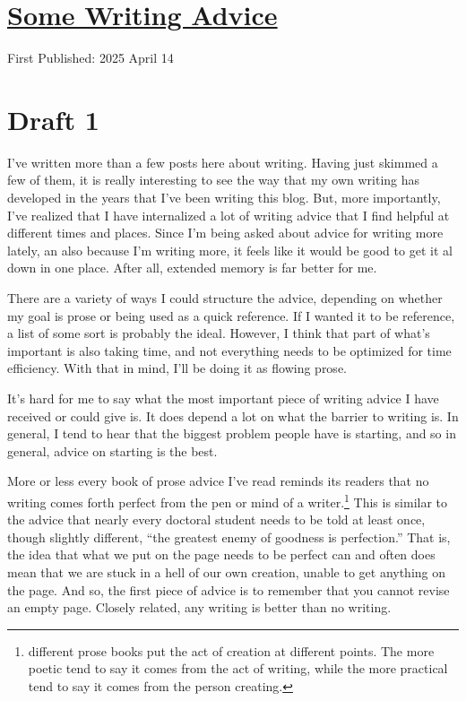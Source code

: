 \documentclass[12pt]{article}
\newcommand{\say}[1]{``#1''}
\renewcommand{\,}{\textsuperscript{,}}
\begin{document}
  
\doublespacing  
\section{\href{writing-advice.html}{Some Writing Advice}}  
First Published: 2025 April 14

\section{Draft 1}

I've written more than a few posts here about writing.  
Having just skimmed a few of them, it is really interesting to see the way that my own writing has developed in the years that I've been writing this blog.  
But, more importantly, I've realized that I have internalized a lot of writing advice that I find helpful at different times and places.  
Since I'm being asked about advice for writing more lately, an also because I'm writing more, it feels like it would be good to get it al down in one place.  
After all, extended memory is far better for me.

There are a variety of ways I could structure the advice, depending on whether my goal is prose or being used as a quick reference.  
If I wanted it to be reference, a list of some sort is probably the ideal.  
However, I think that part of what's important is also taking time, and not everything needs to be optimized for time efficiency.  
With that in mind, I'll be doing it as flowing prose.

It's hard for me to say what the most important piece of writing advice I have received or could give is.  
It does depend a lot on what the barrier to writing is.  
In general, I tend to hear that the biggest problem people have is starting, and so in general, advice on starting is the best.

More or less every book of prose advice I've read reminds its readers that no writing comes forth perfect from the pen or mind of a writer.\footnote{different prose books put the act of creation at different points. The more poetic tend to say it comes from the act of writing, while the more practical tend to say it comes from the person creating.}  
This is similar to the advice that nearly every doctoral student needs to be told at least once, though slightly different, \say{the greatest enemy of goodness is perfection.}  
That is, the idea that what we put on the page needs to be perfect can and often does mean that we are stuck in a hell of our own creation, unable to get anything on the page.  
And so, the first piece of advice is to remember that you cannot revise an empty page.  
Closely related, any writing is better than no writing.
\end{document}
